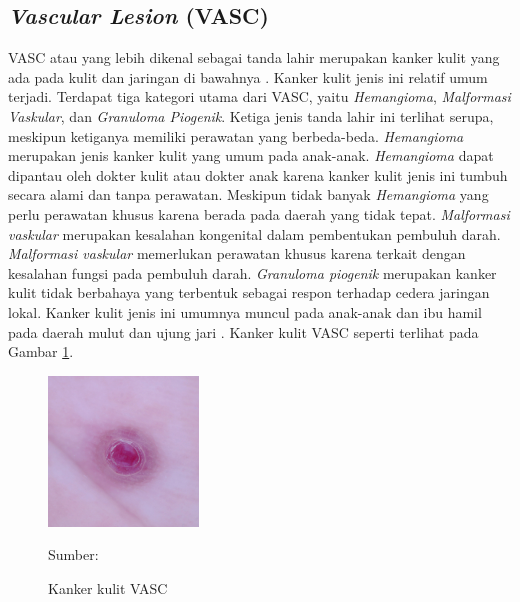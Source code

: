     \subsection{\textit{Vascular Lesion} (VASC)}
    VASC atau yang lebih dikenal sebagai tanda lahir merupakan kanker kulit yang ada pada kulit dan jaringan di bawahnya \citep{Balas2018}. Kanker kulit jenis ini relatif umum terjadi. Terdapat tiga kategori utama dari VASC, yaitu \textit{Hemangioma}, \textit{Malformasi Vaskular}, dan \textit{Granuloma Piogenik}. Ketiga jenis tanda lahir ini terlihat serupa, meskipun ketiganya memiliki perawatan yang berbeda-beda. \textit{Hemangioma} merupakan jenis kanker kulit yang umum pada anak-anak. \textit{Hemangioma} dapat dipantau oleh dokter kulit atau dokter anak karena kanker kulit jenis ini tumbuh secara alami dan tanpa perawatan. Meskipun tidak banyak \textit{Hemangioma} yang perlu perawatan khusus karena berada pada daerah yang tidak tepat. \textit{Malformasi vaskular} merupakan kesalahan kongenital dalam pembentukan pembuluh darah. \textit{Malformasi vaskular} memerlukan perawatan khusus karena terkait dengan kesalahan fungsi pada pembuluh darah. \textit{Granuloma piogenik} merupakan kanker kulit tidak berbahaya yang terbentuk sebagai respon terhadap cedera jaringan lokal. Kanker kulit jenis ini umumnya muncul pada anak-anak dan ibu hamil pada daerah mulut dan ujung jari \citep{Rastogi2020}. Kanker kulit VASC seperti terlihat pada Gambar \ref{fig:vasc}.
    \begin{figure}[H] 
        \begin{center} 
            \includegraphics[width=4cm]{../img/Skin Cancer VASC - Latex.jpg}
            \caption{Kanker kulit VASC} 
            \label{fig:vasc}
            Sumber: \citep{Codella2018,Combalia2019,Tschandl2018}
        \end{center} 
    \end{figure}

